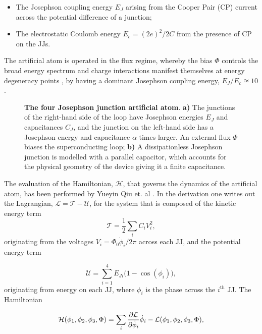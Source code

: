   \begin{itemize}
  	\item The Josephson coupling energy $ E_J $ arising from the Cooper Pair (CP) current across the potential difference of a junction;
  	\item The electrostatic Coulomb energy $ E_c=(2e)^2/2C $ from the presence of CP on the JJs. 
  \end{itemize}

  The artificial atom is operated in the flux regime, whereby the bias $ \Phi $ controls the broad energy spectrum and charge interactions manifest themselves at energy degeneracy points \cite{Atomicphysicsandquantumoptics}, by having a dominant Josephson coupling energy, $ E_J/E_c \approxeq 10 $.
    
  \begin{figure}
  	\caption{\small\textbf{The four Josephson junction artificial atom}. \textbf{a)} The junctions of the right-hand side of the loop have Josephson energies $ E_J $ and capacitances $ C_J $, and the junction on the left-hand side has a Josephson energy and capacitance $ \alpha $ times larger. An external flux $ \Phi $ biases the superconducting loop; \textbf{b)} A dissipationless Josephson junction is modelled with a parallel capacitor, which accounts for the physical geometry of the device giving it a finite capacitance.}
  	\label{theoryCircuitModel}
  \end{figure}

  The evaluation of the Hamiltonian, $ \mathcal{H} $, that governs the dynamics of the artificial atom, has been performed by Yueyin Qiu et. al \cite{FourJunctionSuperconductingCircuit}. In the derivation one writes out the Lagrangian, $ \mathcal{L} = \mathcal{T} - \mathcal{U} $, for the system that is composed of the kinetic energy term 
  	\begin{equation}
  	\mathcal{T} =  \frac{1}{2}\sum_{i}C_iV_i^2,
  	\end{equation} 
  	\noindent originating from the voltages $ V_i =  \Phi_0\dot{\phi}_i/2\pi$ across each JJ, and the potential energy term
  	
  	\begin{equation}
	  	\mathcal{U} = \sum_{i=1}^{4}E_{Ji}\big(1-\cos(\phi_i)\big),
  	\end{equation} 
  	\noindent originating from energy on each JJ, where $ \phi_i $ is the phase across the $ i^{\text{th}} $ JJ. The Hamiltonian
  
  \begin{equation}
  	\mathcal{H}(\phi_1,\phi_2,\phi_3,\Phi) = \sum_i \frac{\partial\mathcal{L}}{\partial\dot{\phi}_i}\dot{\phi}_i - \mathcal{L}(\phi_1,\phi_2,\phi_3,\Phi),
  \end{equation} 
  
